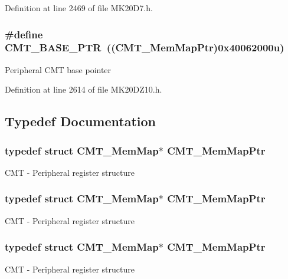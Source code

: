 Definition at line 2469 of file M\+K20\+D7.\+h.

\subsubsection[{\texorpdfstring{C\+M\+T\+\_\+\+B\+A\+S\+E\+\_\+\+P\+TR}{CMT_BASE_PTR}}]{\setlength{\rightskip}{0pt plus 5cm}\#define C\+M\+T\+\_\+\+B\+A\+S\+E\+\_\+\+P\+TR~(({\bf C\+M\+T\+\_\+\+Mem\+Map\+Ptr})0x40062000u)}\hypertarget{group___c_m_t___peripheral_gae361f199741d5276c4618edb9ee289b7}{}\label{group___c_m_t___peripheral_gae361f199741d5276c4618edb9ee289b7}
Peripheral C\+MT base pointer 

Definition at line 2614 of file M\+K20\+D\+Z10.\+h.



\subsection{Typedef Documentation}
\subsubsection[{\texorpdfstring{C\+M\+T\+\_\+\+Mem\+Map\+Ptr}{CMT_MemMapPtr}}]{\setlength{\rightskip}{0pt plus 5cm}typedef struct {\bf C\+M\+T\+\_\+\+Mem\+Map}$\ast$ {\bf C\+M\+T\+\_\+\+Mem\+Map\+Ptr}}\hypertarget{group___c_m_t___peripheral_ga9764155d28e775ee5d3200941c07f812}{}\label{group___c_m_t___peripheral_ga9764155d28e775ee5d3200941c07f812}
C\+MT -\/ Peripheral register structure 
\subsubsection[{\texorpdfstring{C\+M\+T\+\_\+\+Mem\+Map\+Ptr}{CMT_MemMapPtr}}]{\setlength{\rightskip}{0pt plus 5cm}typedef struct {\bf C\+M\+T\+\_\+\+Mem\+Map}$\ast$ {\bf C\+M\+T\+\_\+\+Mem\+Map\+Ptr}}\hypertarget{group___c_m_t___peripheral_ga9764155d28e775ee5d3200941c07f812}{}\label{group___c_m_t___peripheral_ga9764155d28e775ee5d3200941c07f812}
C\+MT -\/ Peripheral register structure 
\subsubsection[{\texorpdfstring{C\+M\+T\+\_\+\+Mem\+Map\+Ptr}{CMT_MemMapPtr}}]{\setlength{\rightskip}{0pt plus 5cm}typedef struct {\bf C\+M\+T\+\_\+\+Mem\+Map}$\ast$ {\bf C\+M\+T\+\_\+\+Mem\+Map\+Ptr}}\hypertarget{group___c_m_t___peripheral_ga9764155d28e775ee5d3200941c07f812}{}\label{group___c_m_t___peripheral_ga9764155d28e775ee5d3200941c07f812}
C\+MT -\/ Peripheral register structure 